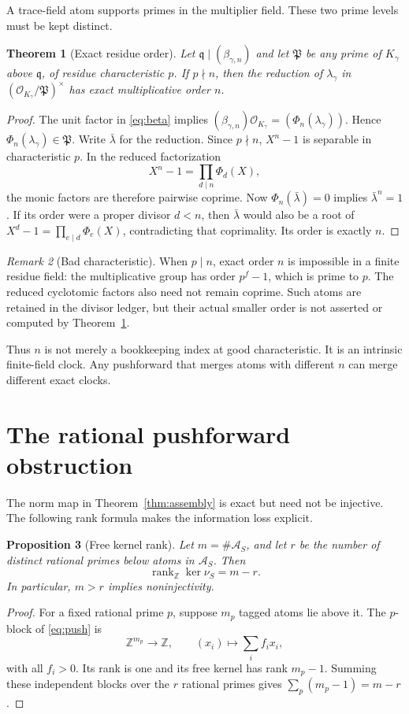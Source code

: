 \documentclass[11pt]{article}
\newtheorem{theorem}{Theorem}[section]
\newtheorem{proposition}[theorem]{Proposition}
\theoremstyle{definition}\newtheorem{definition}[theorem]{Definition}
\theoremstyle{remark}\newtheorem{remark}[theorem]{Remark}
\begin{document}
A trace-field atom supports primes in the multiplier field.  These two
prime levels must be kept distinct.

\begin{theorem}[Exact residue order]
\label{thm:order}
Let $\mathfrak q\mid(\beta_{\gamma,n})$ and let $\mathfrak P$ be any prime
of $K_\gamma$ above $\mathfrak q$, of residue characteristic $p$.  If
$p\nmid n$, then the reduction of $\lambda_\gamma$ in
$(\mathcal O_{K_\gamma}/\mathfrak P)^\times$ has exact multiplicative order
$n$.
\end{theorem}
\begin{proof}
The unit factor in \eqref{eq:beta} implies
$(\beta_{\gamma,n})\mathcal O_{K_\gamma}
=(\Phi_n(\lambda_\gamma))$.  Hence
$\Phi_n(\lambda_\gamma)\in\mathfrak P$.  Write $\bar\lambda$ for the
reduction.  Since $p\nmid n$, $X^n-1$ is separable in characteristic $p$.
In the reduced factorization
\[
X^n-1=\prod_{d\mid n}\Phi_d(X),
\]
the monic factors are therefore pairwise coprime.  Now
$\Phi_n(\bar\lambda)=0$ implies $\bar\lambda^n=1$.  If its order were a
proper divisor $d<n$, then $\bar\lambda$ would also be a root of
$X^d-1=\prod_{e\mid d}\Phi_e(X)$, contradicting that coprimality.  Its
order is exactly $n$.
\end{proof}

\begin{remark}[Bad characteristic]
When $p\mid n$, exact order $n$ is impossible in a finite residue field:
the multiplicative group has order $p^f-1$, which is prime to $p$.  The
reduced cyclotomic factors also need not remain coprime.  Such atoms are
retained in the divisor ledger, but their actual smaller order is not
asserted or computed by Theorem~\ref{thm:order}.
\end{remark}

Thus $n$ is not merely a bookkeeping index at good characteristic.  It is an
intrinsic finite-field clock.  Any pushforward that merges atoms with
different $n$ can merge different exact clocks.

\section{The rational pushforward obstruction}

The norm map in Theorem~\ref{thm:assembly} is exact but need not be
injective.  The following rank formula makes the information loss explicit.

\begin{proposition}[Free kernel rank]
\label{prop:kernel}
Let $m=\#\mathcal A_S$, and let $r$ be the number of distinct rational
primes below atoms in $\mathcal A_S$.  Then
\[
\operatorname{rank}_{\mathbb Z}\ker\nu_S=m-r.
\]
In particular, $m>r$ implies noninjectivity.
\end{proposition}
\begin{proof}
For a fixed rational prime $p$, suppose $m_p$ tagged atoms lie above it.
The $p$-block of \eqref{eq:push} is
\[
\mathbb Z^{m_p}\longrightarrow\mathbb Z,
\qquad (x_i)\longmapsto\sum_i f_i x_i,
\]
with all $f_i>0$.  Its rank is one and its free kernel has rank $m_p-1$.
Summing these independent blocks over the $r$ rational primes gives
$\sum_p(m_p-1)=m-r$.
\end{proof}
\end{document}
